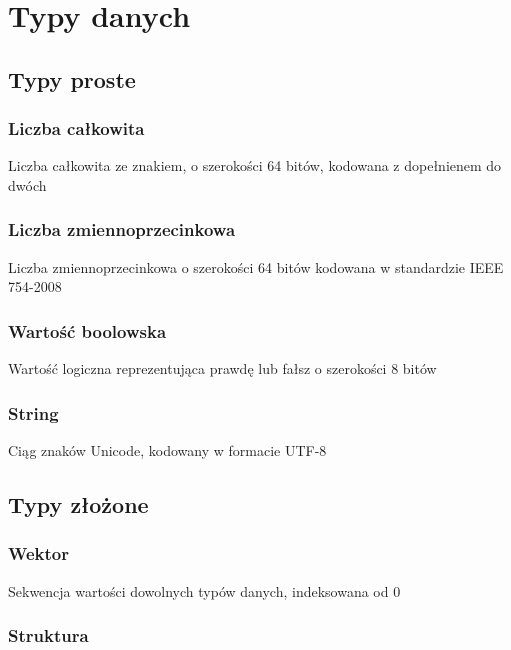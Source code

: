 \section{Typy danych}

\subsection{Typy proste}

\subsubsection{Liczba całkowita}
\label{viuact_spec_datatypes_simple_integer}

Liczba całkowita ze znakiem, o szerokości 64 bitów, kodowana z dopełnienem do dwóch

\subsubsection{Liczba zmiennoprzecinkowa}

Liczba zmiennoprzecinkowa o szerokości 64 bitów kodowana w standardzie IEEE 754-2008

\subsubsection{Wartość boolowska}

Wartość logiczna reprezentująca prawdę lub fałsz o szerokości 8 bitów

\subsubsection{String}

Ciąg znaków Unicode, kodowany w formacie UTF-8

\subsection{Typy złożone}

\subsubsection{Wektor}

Sekwencja wartości dowolnych typów danych, indeksowana od 0

\subsubsection{Struktura}

